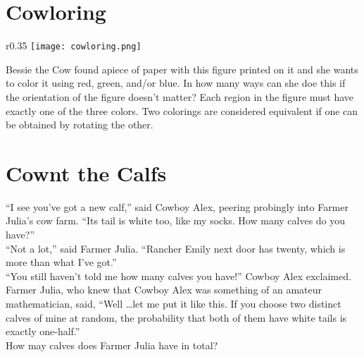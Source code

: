 \documentclass{article}
\begin{document}
\section*{Cowloring}
\begin{wrapfigure}{r}{0.35\linewidth}
    \vspace{-20pt}
    \centering
    \texttt{[image: cowloring.png]}
    \vspace{-20pt}
\end{wrapfigure}
Bessie the Cow found apiece of paper with this figure printed on it and she wants to color it using red, green, and/or blue.
In how many ways can she doe this if the orientation of the figure doesn't matter?
Each region in the figure must have exactly one of the three colors.
Two colorings are considered equivalent if one can be obtained by rotating the other.

\section*{Cownt the Calfs}
``I see you've got a new calf,'' said Cowboy Alex, peering probingly into Farmer Julia's cow farm.
``Its tail is white too, like my socks.
How many calves do you have?'' \\[0.25cm]
``Not a lot,'' said Farmer Julia.
``Rancher Emily next door has twenty, which is more than what I've got.'' \\[0.25cm]
``You still haven't told me how many calves you have!'' Cowboy Alex exclaimed. \\[0.25cm]
Farmer Julia, who knew that Cowboy Alex was something of an amateur mathematician, said, ``Well \ldots let me put it like this.
If you choose two distinct calves of mine at random, the probability that both of them have white tails is exactly one-half.'' \\[0.25cm]
How may calves does Farmer Julia have in total?
\end{document}
